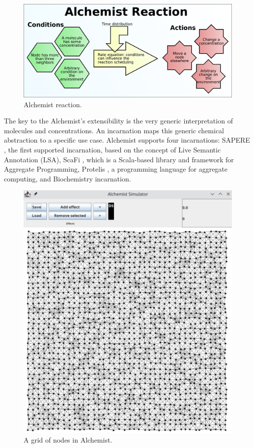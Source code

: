 \documentclass[12pt,a4paper,openright,twoside]{book}
\begin{document}
\begin{figure}[h!]
  \centering
  \includegraphics[width=\textwidth]{figures/alchemist-reaction.png}
  \caption{Alchemist reaction.}
  \label{fig:alchemist-reaction}
\end{figure}

The key to the Alchemist's extensibility is the very generic interpretation of molecules and concentrations. An incarnation maps this generic chemical abstraction to a specific use case.
Alchemist supports four incarnations:
SAPERE \cite{DBLP:conf/saso/CastelliMRZ11}, the first supported incarnation, based on the concept of Live Semantic Annotation (LSA),
ScaFi \cite{DBLP:journals/softx/CasadeiVAP22}, which is a Scala-based library and framework for Aggregate Programming,
Protelis \cite{DBLP:conf/sac/PianiniVB15}, a programming language for aggregate computing, and
Biochemistry incarnation.

\begin{figure}[h!]
  \centering
  \includegraphics[width=\textwidth]{figures/alchemist.png}
  \caption{A grid of nodes in Alchemist.}
\end{figure}
\end{document}
